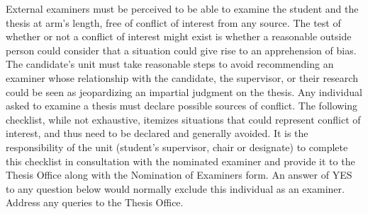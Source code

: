 \documentclass[
  openany]{book}
\begin{document}
External examiners must be perceived to be able to examine the student and the thesis at arm's length, free of conflict of interest from any source. The test of whether or not a conflict of interest might exist is whether a reasonable outside person could consider that a situation could give rise to an apprehension of bias. The candidate's unit must take reasonable steps to avoid recommending an examiner whose relationship with the candidate, the supervisor, or their research could be seen as jeopardizing an impartial judgment on the thesis. Any individual asked to examine a thesis must declare possible sources of conflict. The following checklist, while not exhaustive, itemizes situations that could represent conflict of interest, and thus need to be declared and generally avoided. It is the responsibility of the unit (student's supervisor, chair or designate) to complete this checklist in consultation with the nominated examiner and provide it to the Thesis Office along with the Nomination of Examiners form. An answer of YES to any question below would normally exclude this individual as an examiner. Address any queries to the Thesis Office.
\end{document}
